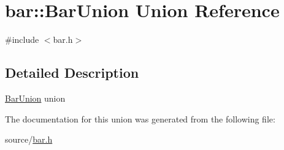 \hypertarget{unionbar_1_1BarUnion}{}\section{bar\+:\+:Bar\+Union Union Reference}
\label{unionbar_1_1BarUnion}


{\ttfamily \#include $<$bar.\+h$>$}



\subsection{Detailed Description}
\hyperlink{unionbar_1_1BarUnion}{Bar\+Union} union 

The documentation for this union was generated from the following file\+:\begin{DoxyCompactItemize}
\item 
source/\hyperlink{bar_8h}{bar.\+h}\end{DoxyCompactItemize}
